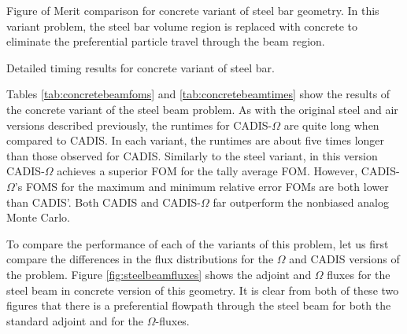 \begin{table}[h!]
  \centering
  
  \caption[Figure of Merit comparison for concrete variant of steel bar geometry.]
  {Figure of Merit comparison for concrete variant of steel bar geometry. In this
  variant problem, the steel bar volume region is replaced with concrete to
  eliminate the preferential particle travel through the beam region.}
  \label{tab:concretebeamfoms}
\end{table}

\begin{table}[h!]
  \centering
  
  \caption[Detailed timing results for concrete variant of steel bar.]
  {Detailed timing results for concrete variant of steel bar.}
  \label{tab:concretebeamtimes}
\end{table}

Tables \ref{tab:concretebeamfoms} and \ref{tab:concretebeamtimes} show the
results of the concrete variant of the steel beam problem. As with the original
steel and air versions described previously, the runtimes for CADIS-$\Omega$ are quite
long when compared to CADIS. In each variant, the runtimes are about five times
longer than those observed for CADIS. Similarly to the steel variant, in this
version CADIS-$\Omega$ achieves a superior FOM for the tally average FOM.
However, CADIS-$\Omega$'s FOMS for the maximum and minimum relative error FOMs
are both lower than CADIS'. Both CADIS and CADIS-$\Omega$ far outperform the
nonbiased analog Monte Carlo.

To compare the performance of each of the variants of this problem, let us first
compare the differences in the flux distributions for the $\Omega$ and CADIS
versions of the problem. Figure \ref{fig:steelbeamfluxes} shows the
adjoint and $\Omega$ fluxes for
the steel beam in concrete version of this geometry. It is clear from both of
these two figures that there is a preferential flowpath through the steel beam
for both the standard adjoint and for the $\Omega$-fluxes.

